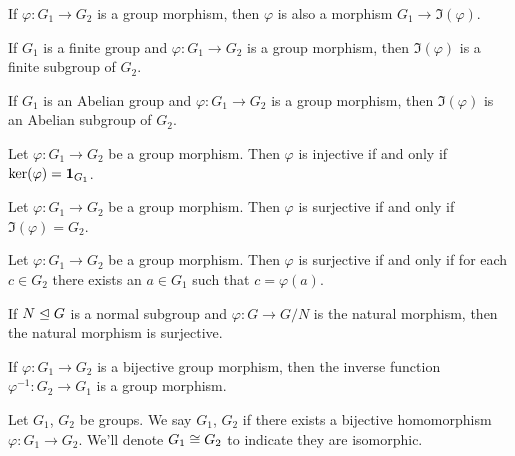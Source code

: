 \begin{theorem}
If $\varphi\colon G_{1}\to G_{2}$ is a group morphism,
then $\varphi$ is also a morphism $G_{1}\to\Im(\varphi)$.
\end{theorem}

\begin{theorem}
If $G_{1}$ is a finite group and $\varphi\colon G_{1}\to G_{2}$ is a
group morphism, then $\Im(\varphi)$ is a finite subgroup of $G_{2}$.
\end{theorem}

\begin{theorem}
If $G_{1}$ is an Abelian group and $\varphi\colon G_{1}\to G_{2}$ is a
group morphism, then $\Im(\varphi)$ is an Abelian subgroup of $G_{2}$.
\end{theorem}

\begin{theorem}
Let $\varphi\colon G_{1}\to G_{2}$ be a group morphism. Then
$\varphi$ is injective if and only if $\ker(\varphi)=\mathbf{1}_{G_{1}}$.
\end{theorem}

\begin{theorem}
Let $\varphi\colon G_{1}\to G_{2}$ be a group morphism. Then
$\varphi$ is surjective if and only if $\Im(\varphi)=G_{2}$.
\end{theorem}

\begin{theorem}
Let $\varphi\colon G_{1}\to G_{2}$ be a group morphism. Then
$\varphi$ is surjective if and only if for each $c\in G_{2}$ there
exists an $a\in G_{1}$ such that $c=\varphi(a)$.
\end{theorem}

\begin{theorem}
If $N\trianglelefteq G$ is a normal subgroup and $\varphi\colon G\to G/N$
is the natural morphism, then the natural morphism is surjective.
\end{theorem}

\begin{theorem}
If $\varphi\colon G_{1}\to G_{2}$ is a bijective group morphism,
then the inverse function $\varphi^{-1}\colon G_{2}\to G_{1}$ is a group
morphism. 
\end{theorem}

\begin{definition}
Let $G_{1}$, $G_{2}$ be groups. We say $G_{1}$, $G_{2}$  
if there exists a bijective homomorphism $\varphi\colon G_{1}\to G_{2}$.
We'll denote $G_{1}\cong G_{2}$ to indicate they are isomorphic.
\end{definition}

